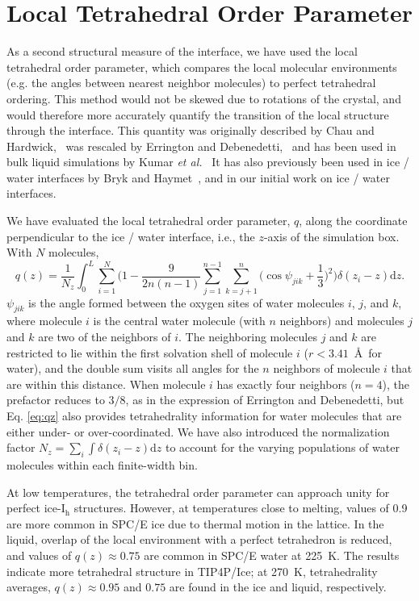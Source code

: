 \section{Local Tetrahedral Order Parameter}\label{sec:tetra}
As a second structural measure of the interface, we have used the
local tetrahedral order parameter, which compares the local molecular
environments (e.g. the angles between nearest neighbor molecules) to
perfect tetrahedral ordering. This method would not be skewed due to
rotations of the crystal, and would therefore more accurately quantify
the transition of the local structure through the interface. This
quantity was originally described by Chau and
Hardwick,~\cite{Chau1998} was rescaled by Errington and
Debenedetti,~\cite{Errington2001} and has been used in bulk liquid
simulations by Kumar \textit{et al.}~\cite{Kumar2009} It has also
previously been used in ice / water interfaces by Bryk and
Haymet~\cite{Bryk2004}, and in our initial work on ice / water
interfaces\cite{Louden2013a}.

We have evaluated the local tetrahedral order parameter, $q$, along
the coordinate perpendicular to the ice / water interface, i.e., the
$z$-axis of the simulation box. With $N$ molecules,
\begin{equation}
q(z) = \frac{1}{N_z} \int_0^L \sum_{i=1}^{N} \Bigg(1 -\frac{9}{2n(n-1)}\sum_{j=1}^{n-1}
\sum_{k=j+1}^{n} \bigg(\cos\psi_{jik}+\frac{1}{3}\bigg)^2\Bigg)
\delta(z_{i}-z)\mathrm{d}z .
\label{eq:qz}
\end{equation}
$\psi_{jik}$ is the angle formed between the oxygen sites of water
molecules $i$, $j$, and $k$, where molecule $i$ is the central water
molecule (with $n$ neighbors) and molecules $j$ and $k$ are two of the
neighbors of $i$.  The neighboring molecules $j$ and $k$ are
restricted to lie within the first solvation shell of molecule $i$
($r < 3.41$~\AA\ for water), and the double sum visits all angles for
the $n$ neighbors of molecule $i$ that are within this distance.  When
molecule $i$ has exactly four neighbors ($n=4$), the prefactor reduces
to $3/8$, as in the expression of Errington and Debenedetti, but
Eq. \eqref{eq:qz} also provides tetrahedrality information for water
molecules that are either under- or over-coordinated. We have also
introduced the normalization factor
$N_z = \sum_i \int \delta(z_i - z) \mathrm{d}z$ to account for the
varying populations of water molecules within each finite-width bin.

At low temperatures, the tetrahedral order parameter can approach
unity for perfect ice-I$_\mathrm{h}$ structures. However, at
temperatures close to melting, values of 0.9 are more common in SPC/E
ice due to thermal motion in the lattice. In the liquid, overlap of
the local environment with a perfect tetrahedron is reduced, and
values of $q(z) \approx 0.75$ are common in SPC/E water at 225~K. The
results indicate more tetrahedral structure in TIP4P/Ice; at
270~K, tetrahedrality averages, $q(z) \approx 0.95$ and $0.75$ are
found in the ice and liquid, respectively.

